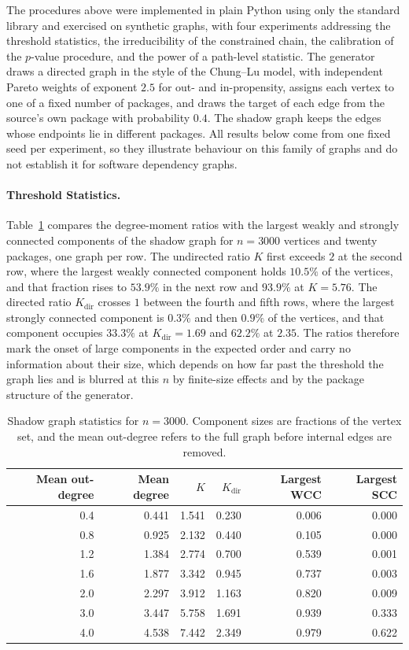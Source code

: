 \documentclass[11pt]{article}
\begin{document}
The procedures above were implemented in plain Python using only the standard library and exercised on synthetic graphs, with four experiments addressing the threshold statistics, the irreducibility of the constrained chain, the calibration of the $p$-value procedure, and the power of a path-level statistic. The generator draws a directed graph in the style of the Chung--Lu model, with independent Pareto weights of exponent $2.5$ for out- and in-propensity, assigns each vertex to one of a fixed number of packages, and draws the target of each edge from the source's own package with probability $0.4$. The shadow graph keeps the edges whose endpoints lie in different packages. All results below come from one fixed seed per experiment, so they illustrate behaviour on this family of graphs and do not establish it for software dependency graphs.

\paragraph{Threshold Statistics.} Table~\ref{tab:threshold} compares the degree-moment ratios with the largest weakly and strongly connected components of the shadow graph for $n=3000$ vertices and twenty packages, one graph per row. The undirected ratio $K$ first exceeds $2$ at the second row, where the largest weakly connected component holds $10.5\%$ of the vertices, and that fraction rises to $53.9\%$ in the next row and $93.9\%$ at $K=5.76$. The directed ratio $K_{\mathrm{dir}}$ crosses $1$ between the fourth and fifth rows, where the largest strongly connected component is $0.3\%$ and then $0.9\%$ of the vertices, and that component occupies $33.3\%$ at $K_{\mathrm{dir}}=1.69$ and $62.2\%$ at $2.35$. The ratios therefore mark the onset of large components in the expected order and carry no information about their size, which depends on how far past the threshold the graph lies and is blurred at this $n$ by finite-size effects and by the package structure of the generator.

\begin{table}[h]
\centering
\begin{tabular}{rrrrrr}
\hline
Mean out-degree & Mean degree & $K$ & $K_{\mathrm{dir}}$ & Largest WCC & Largest SCC \\
\hline
0.4 & 0.441 & 1.541 & 0.230 & 0.006 & 0.000 \\
0.8 & 0.925 & 2.132 & 0.440 & 0.105 & 0.000 \\
1.2 & 1.384 & 2.774 & 0.700 & 0.539 & 0.001 \\
1.6 & 1.877 & 3.342 & 0.945 & 0.737 & 0.003 \\
2.0 & 2.297 & 3.912 & 1.163 & 0.820 & 0.009 \\
3.0 & 3.447 & 5.758 & 1.691 & 0.939 & 0.333 \\
4.0 & 4.538 & 7.442 & 2.349 & 0.979 & 0.622 \\
\hline
\end{tabular}
\caption{Shadow graph statistics for $n=3000$. Component sizes are fractions of the vertex set, and the mean out-degree refers to the full graph before internal edges are removed.}
\label{tab:threshold}
\end{table}
\end{document}
